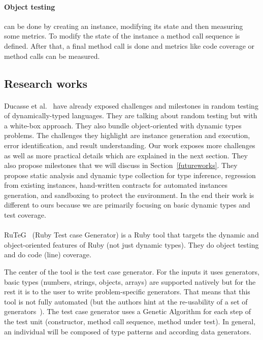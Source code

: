 \documentclass{llncs2e/llncs}
\begin{document}
\paragraph{Object testing} can be done by creating an instance, modifying its
state and then measuring some metrics. To modify the state of the instance a
method call sequence is defined. After that, a final method call is done and
metrics like code coverage or method calls can be measured.

\subsection{Research works}
\label{related_research}

\paragraph{} Ducasse et al.~\cite{ducasse2011challenges} have already exposed
challenges and milestones in random testing of dynamically-typed languages.
They are talking about random testing but with a white-box approach. They also
bundle object-oriented with dynamic types problems. The challenges they
highlight are instance generation and execution, error identification, and
result understanding. Our work exposes more challenges as well as more practical
details which are explained in the next section. They also propose milestones
that we will discuss in Section~\ref{futureworks}. They propose static analysis
and dynamic type collection for type inference, regression from existing
instances, hand-written contracts for automated instances generation, and
sandboxing to protect the environment. In the end their work is different to
ours because we are primarily focusing on basic dynamic types and test coverage.

\paragraph{} RuTeG~\cite{mairhofer2011search} (Ruby Test case Generator) is a
Ruby tool that targets the dynamic and object-oriented features of Ruby (not
just dynamic types). They do object testing and do code (line) coverage.

The center of the tool is the test case generator. For the inputs it uses
generators, basic types (numbers, strings, objects, arrays) are supported
natively but for the rest it is to the user to write problem-specific
generators. That means that this tool is not fully automated (but the authors
hint at the re-usability of a set of generators~\cite{feldt2002biomimetic}). The
test case generator uses a Genetic Algorithm for each step of the test unit
(constructor, method call sequence, method under test). In general, an
individual will be composed of type patterns and according data generators.
\end{document}
